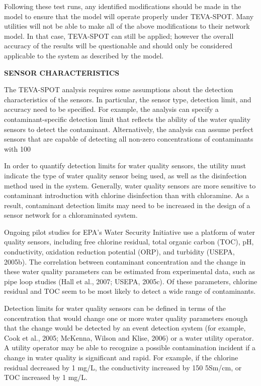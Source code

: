 Following these test runs, any identified modifications should be made in the model to ensure that the model will operate properly under TEVA-SPOT.   Many utilities will not be able to make all of the above modifications to their network model.  In that case, TEVA-SPOT can still be applied; however the overall accuracy of the results will be questionable and should only be considered applicable to the system as described by the model.

{\bf SENSOR CHARACTERISTICS}
 
The TEVA-SPOT analysis requires some assumptions about the detection characteristics of the sensors. In particular, the sensor type, detection limit, and accuracy need to be specified.  For example, the analysis can specify a contaminant-specific detection limit that reflects the ability of the water quality sensors to detect the contaminant. Alternatively, the analysis can assume perfect sensors that are capable of detecting all non-zero concentrations of contaminants with 100%

In order to quantify detection limits for water quality sensors, the utility must indicate the type of water quality sensor being used, as well as the disinfection method used in the system. Generally, water quality sensors are more sensitive to contaminant introduction with chlorine disinfection than with chloramine.  As a result, contaminant detection limits may need to be increased in the design of a sensor network for a chloraminated system.

Ongoing pilot studies for EPA's Water Security Initiative use a platform of water quality sensors, including free chlorine residual, total organic carbon (TOC), pH, conductivity, oxidation reduction potential (ORP), and turbidity (USEPA, 2005b). The correlation between contaminant concentration and the change in these water quality parameters can be estimated from experimental data, such as pipe loop studies (Hall et al., 2007; USEPA, 2005c). Of these parameters, chlorine residual and TOC seem to be most likely to detect a wide range of contaminants. 

Detection limits for water quality sensors can be defined in terms of the concentration that would change one or more water quality parameters enough that the change would be detected by an event detection system (for example, Cook et al., 2005; McKenna, Wilson and Klise, 2006) or a water utility operator. A utility operator may be able to recognize a possible contamination incident if a change in water quality is significant and rapid. For example, if the chlorine residual decreased by 1 mg/L, the conductivity increased by 150 5Sm/cm, or TOC increased by 1 mg/L.

